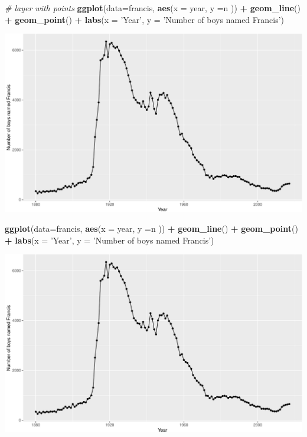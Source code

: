\documentclass[
]{book}
\newenvironment{Shaded}{\begin{snugshade}}{\end{snugshade}}
\newcommand{\CommentTok}[1]{\textcolor[rgb]{0.56,0.35,0.01}{\textit{#1}}}
\newcommand{\DataTypeTok}[1]{\textcolor[rgb]{0.13,0.29,0.53}{#1}}
\newcommand{\KeywordTok}[1]{\textcolor[rgb]{0.13,0.29,0.53}{\textbf{#1}}}
\newcommand{\NormalTok}[1]{#1}
\newcommand{\OperatorTok}[1]{\textcolor[rgb]{0.81,0.36,0.00}{\textbf{#1}}}
\newcommand{\StringTok}[1]{\textcolor[rgb]{0.31,0.60,0.02}{#1}}
\begin{document}
\begin{Shaded}
\begin{Highlighting}[]

\CommentTok{# layer with points}
\KeywordTok{ggplot}\NormalTok{(}\DataTypeTok{data=}\NormalTok{francis, }\KeywordTok{aes}\NormalTok{(}\DataTypeTok{x =}\NormalTok{ year, }\DataTypeTok{y =}\NormalTok{n )) }\OperatorTok{+}\StringTok{ }\KeywordTok{geom_line}\NormalTok{() }\OperatorTok{+}\StringTok{ }\KeywordTok{geom_point}\NormalTok{() }\OperatorTok{+}\StringTok{ }\KeywordTok{labs}\NormalTok{(}\DataTypeTok{x =} \StringTok{'Year'}\NormalTok{, }\DataTypeTok{y =} \StringTok{'Number of boys named Francis'}\NormalTok{)}
\end{Highlighting}
\end{Shaded}

\includegraphics{figures/unnamed-chunk-148-2.pdf}

\begin{Shaded}
\begin{Highlighting}[]

\KeywordTok{ggplot}\NormalTok{(}\DataTypeTok{data=}\NormalTok{francis, }\KeywordTok{aes}\NormalTok{(}\DataTypeTok{x =}\NormalTok{ year, }\DataTypeTok{y =}\NormalTok{n )) }\OperatorTok{+}\StringTok{ }\KeywordTok{geom_line}\NormalTok{() }\OperatorTok{+}\StringTok{ }\KeywordTok{geom_point}\NormalTok{() }\OperatorTok{+}\StringTok{ }\KeywordTok{labs}\NormalTok{(}\DataTypeTok{x =} \StringTok{'Year'}\NormalTok{, }\DataTypeTok{y =} \StringTok{'Number of boys named Francis'}\NormalTok{)}
\end{Highlighting}
\end{Shaded}

\includegraphics{figures/unnamed-chunk-148-3.pdf}
\end{document}
